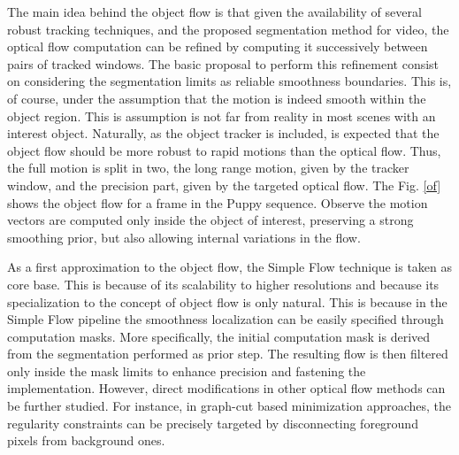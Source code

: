 The main idea behind the object flow is that given the availability of several robust tracking techniques, and the proposed
segmentation method for video, the optical flow computation can be refined by computing it successively between pairs
of tracked windows. The basic proposal to perform this refinement consist on considering the segmentation limits  as reliable smoothness boundaries. 
This is, of course, under the assumption that the motion is indeed smooth within the object region. 
This is assumption is not far from reality in most scenes with an interest object. 
Naturally, as the object tracker is included, is expected that the object flow should be more robust to rapid motions than the
optical flow. 
Thus, the full motion is split in two, the long range motion, given by the tracker window, and the precision part, given by the targeted optical flow. The Fig. \ref{of} shows 
the object flow for a frame in the Puppy sequence. Observe the motion vectors are computed only inside the object of interest, preserving a strong smoothing prior, but 
also allowing internal variations in the flow. 

As a first approximation to the object flow, the Simple Flow technique \cite{c21} is taken as core base. This is because of its scalability 
to higher resolutions and because its specialization to the concept of object flow is only natural. This is because in the Simple Flow pipeline 
the smoothness localization can be easily specified through computation masks. More specifically, the initial computation mask is derived from 
the segmentation performed as prior step. The resulting flow is then filtered only inside the mask limits to enhance precision and fastening the 
implementation. However, direct modifications in other optical flow methods can be further studied. For instance, in graph-cut based 
minimization approaches, the regularity constraints can be precisely targeted by disconnecting foreground pixels from background ones.


